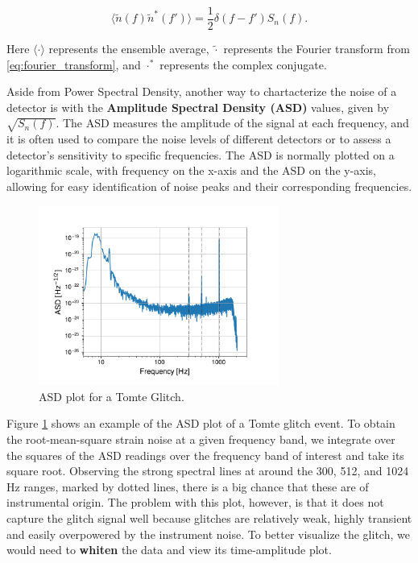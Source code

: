 \documentclass[12pt]{article}
\begin{document}
\begin{equation}
  \langle \tilde{n}(f) \tilde{n}^*(f') \rangle = \frac{1}{2} \delta(f - f') S_n(f).
  \label{eq:psd_relation}
\end{equation}

\noindent Here $\langle \cdot \rangle$ represents the ensemble average, $\tilde{\cdot}$ represents the Fourier transform from \ref{eq:fourier_transform}, and $\cdot^\ast$ represents the complex conjugate. 

\medskip
\noindent Aside from Power Spectral Density, another way to chartacterize the noise of a detector is with the \textbf{Amplitude Spectral Density (ASD)} values, given by $\sqrt{S_n(f)}$. The ASD measures the amplitude of the signal at each frequency, and it is often used to compare the noise levels of different detectors or to assess a detector's sensitivity to specific frequencies. The ASD is normally plotted on a logarithmic scale, with frequency on the x-axis and the ASD on the y-axis, allowing for easy identification of noise peaks and their corresponding frequencies.

\begin{figure}[H]
  \centering
  \includegraphics[width=0.7\textwidth]{images/unwhitened_asd.pdf}
  \caption{ASD plot for a Tomte Glitch.}
  \label{fig:asdtomte}
\end{figure}

\medskip
\noindent Figure \ref{fig:asdtomte} shows an example of the ASD plot of a Tomte glitch event. To obtain the root-mean-square strain noise at a given frequency band, we integrate over the squares of the ASD readings over the frequency band of interest and take its square root. Observing the strong spectral lines at around the 300, 512, and 1024 Hz ranges, marked by dotted lines, there is a big chance that these are of instrumental origin. The problem with this plot, however, is that it does not capture the glitch signal well because glitches are relatively weak, highly transient and easily overpowered by the instrument noise. To better visualize the glitch, we would need to \textbf{whiten} the data and view its time-amplitude plot.
\end{document}
